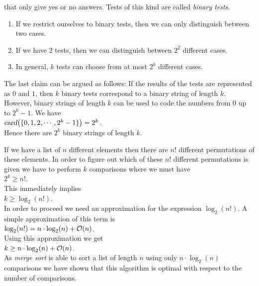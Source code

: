 that only give yes or no answers.  Tests of this kind are called \emph{binary tests}.
\begin{enumerate}
\item If we restrict ourselves to binary tests, then we can only distinguish between two cases.
\item If we have $2$ tests, then we can distinguish between  $2^2$ different cases.
\item In general, $k$ tests can choose from at most $2^k$ different cases.
\end{enumerate}
The last claim can be argued as follows:  If the results of the tests are represented as
$0$ and $1$, then $k$ binary tests correspond to a binary string of length
$k$.  However, binary strings of length $k$ can be used to code the numbers from $0$ up to
$2^{k}-1$.  We have
\\[0.2cm]
\hspace*{1.3cm}
$\textsl{card}\bigl(\{0,1,2,\cdots, 2^k-1\}\bigr) = 2^k$.
\\[0.2cm]
Hence there are $2^k$ binary strings of length $k$.  

If we have a list of $n$ different elements then there are $n!$ different permutations of these
elements.  In order to figure out which of these $n!$ different permutations is given we have to
perform $k$ comparisons where we must have
\\[0.2cm]
\hspace*{1.3cm}
$2^k \geq n!$.
\\[0.2cm]
This immediately implies
\\[0.2cm]
\hspace*{1.3cm}
$k \geq \log_2(n!)$.
\\[0.2cm]
In order to proceed we need an approximation for the expression $\log_2(n!)$.  
A simple approximation of this term is
\\[0.2cm]
\hspace*{1.3cm}
$\log_2(n!) = n \cdot \log_2(n) + \mathcal{O}(n)$.
\\[0.2cm]
Using this approximation we get
\\[0.2cm]
\hspace*{1.3cm}
$k \geq n \cdot \log_2(n) + \mathcal{O}(n)$.
\\[0.2cm]
As \emph{merge sort} is able to sort a list of length $n$ using only $n \cdot \log_2(n)$ comparisons
we have shown that this algorithm is optimal with respect to the number of comparisons.


